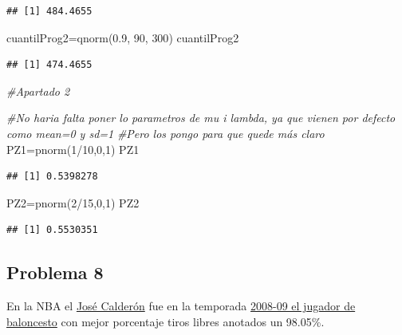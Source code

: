 \documentclass[
]{article}
\newenvironment{Shaded}{\begin{snugshade}}{\end{snugshade}}
\newcommand{\CommentTok}[1]{\textcolor[rgb]{0.56,0.35,0.01}{\textit{#1}}}
\newcommand{\DecValTok}[1]{\textcolor[rgb]{0.00,0.00,0.81}{#1}}
\newcommand{\FloatTok}[1]{\textcolor[rgb]{0.00,0.00,0.81}{#1}}
\newcommand{\FunctionTok}[1]{\textcolor[rgb]{0.00,0.00,0.00}{#1}}
\newcommand{\NormalTok}[1]{#1}
\newcommand{\OtherTok}[1]{\textcolor[rgb]{0.56,0.35,0.01}{#1}}
\newcommand{\SpecialCharTok}[1]{\textcolor[rgb]{0.00,0.00,0.00}{#1}}
\begin{document}
\begin{verbatim}
## [1] 484.4655
\end{verbatim}

\begin{Shaded}
\begin{Highlighting}[]
\NormalTok{cuantilProg2}\OtherTok{=}\FunctionTok{qnorm}\NormalTok{(}\FloatTok{0.9}\NormalTok{, }\DecValTok{90}\NormalTok{, }\DecValTok{300}\NormalTok{)}
\NormalTok{cuantilProg2}
\end{Highlighting}
\end{Shaded}

\begin{verbatim}
## [1] 474.4655
\end{verbatim}

\begin{Shaded}
\begin{Highlighting}[]
\CommentTok{\#Apartado 2}

\CommentTok{\#No haria falta poner lo parametros de mu i lambda, ya que vienen por defecto como mean=0 y sd=1}
\CommentTok{\#Pero los pongo para que quede más claro}
\NormalTok{PZ1}\OtherTok{=}\FunctionTok{pnorm}\NormalTok{(}\DecValTok{1}\SpecialCharTok{/}\DecValTok{10}\NormalTok{,}\DecValTok{0}\NormalTok{,}\DecValTok{1}\NormalTok{)}
\NormalTok{PZ1}
\end{Highlighting}
\end{Shaded}

\begin{verbatim}
## [1] 0.5398278
\end{verbatim}

\begin{Shaded}
\begin{Highlighting}[]
\NormalTok{PZ2}\OtherTok{=}\FunctionTok{pnorm}\NormalTok{(}\DecValTok{2}\SpecialCharTok{/}\DecValTok{15}\NormalTok{,}\DecValTok{0}\NormalTok{,}\DecValTok{1}\NormalTok{)}
\NormalTok{PZ2}
\end{Highlighting}
\end{Shaded}

\begin{verbatim}
## [1] 0.5530351
\end{verbatim}

\hypertarget{problema-8}{%
\subsection{Problema 8}\label{problema-8}}

En la NBA el
\href{https://es.wikipedia.org/wiki/Jos\%C3\%A9_Manuel_Calder\%C3\%B3n}{José
Calderón} fue en la temporada
\href{https://es.wikipedia.org/wiki/L\%C3\%ADderes_en_porcentaje_de_tiros_libres_de_la_NBA}{2008-09
el jugador de baloncesto} con mejor porcentaje tiros libres anotados un
98.05\%.
\end{document}
